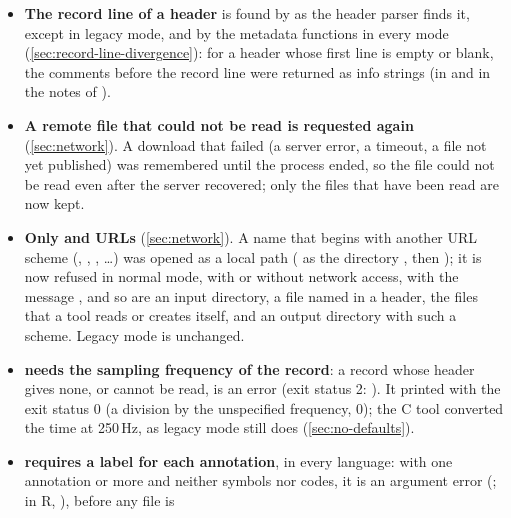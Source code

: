 \begin{itemize}
{  } as  does (a fraction, NaN or an
  infinite value is an error, before the file is opened: , ), and closes
  the annotation file whatever happens.
\item \textbf{The record line of a header} is found by  as
  the header parser finds it, except in legacy mode, and by the metadata
  functions in every mode (\cref{sec:record-line-divergence}): for a header
  whose first line is empty or blank, the comments before the record line
  were returned as info strings (in  and in the notes of
  ).
\item \textbf{A remote file that could not be read is requested again}
  (\cref{sec:network}). A download that failed (a server error, a timeout, a
  file not yet published) was remembered until the process ended, so the
  file could not be read even after the server recovered; only the files
  that have been read are now kept.
\item \textbf{Only  and  URLs}
  (\cref{sec:network}). A name that begins with another URL scheme
  (, , , \ldots) was opened as a
  local path ( as the directory , then
  ); it is now refused in normal mode, with or without
  network access, with the message , and so are an input directory, a file named in a
  header, the files that a tool reads or creates itself, and an output
  directory with such a scheme. Legacy mode is unchanged.
\item \textbf{ needs the sampling frequency of the record}:
  a record whose header gives none, or cannot be read, is an error (exit
  status 2: ). It printed  with the exit status 0
  (a division by the unspecified frequency, 0); the C tool converted the time
  at 250\,Hz, as legacy mode still does (\cref{sec:no-defaults}).
\item \textbf{ requires a label for each
  annotation}, in every language: with one annotation or more and neither
  symbols nor codes, it is an argument error (; in R, ), before any file is

\end{itemize}
